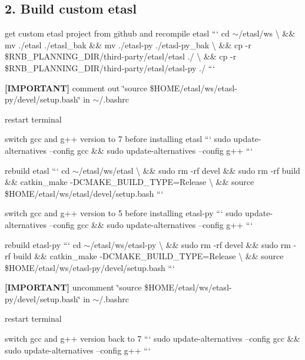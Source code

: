 \subsection*{2. Build custom etasl}


\begin{DoxyItemize}
\item get custom etasl project from github and recompile etasl ``` cd $\sim$/etasl/ws \textbackslash{} \&\& mv ./etasl ./etasl\+\_\+bak \&\& mv ./etasl-\/py ./etasl-\/py\+\_\+bak \textbackslash{} \&\& cp -\/r \$\+R\+N\+B\+\_\+\+P\+L\+A\+N\+N\+I\+N\+G\+\_\+\+D\+IR/third-\/party/etasl/etasl ./ \textbackslash{} \&\& cp -\/r \$\+R\+N\+B\+\_\+\+P\+L\+A\+N\+N\+I\+N\+G\+\_\+\+D\+IR/third-\/party/etasl/etasl-\/py ./ ```
\item {\bfseries \mbox{[}I\+M\+P\+O\+R\+T\+A\+NT\mbox{]}} comment out \char`\"{}source \$\+H\+O\+M\+E/etasl/ws/etasl-\/py/devel/setup.\+bash\char`\"{} in $\sim$/.bashrc
\item restart terminal
\item switch gcc and g++ version to 7 before installing etasl ``` sudo update-\/alternatives --config gcc \&\& sudo update-\/alternatives --config g++ ```
\item rebuild etasl ``` cd $\sim$/etasl/ws/etasl \textbackslash{} \&\& sudo rm -\/rf devel \&\& sudo rm -\/rf build \&\& catkin\+\_\+make -\/\+D\+C\+M\+A\+K\+E\+\_\+\+B\+U\+I\+L\+D\+\_\+\+T\+Y\+PE=Release \textbackslash{} \&\& source \$\+H\+O\+ME/etasl/ws/etasl/devel/setup.bash ```
\item switch gcc and g++ version to 5 before installing etasl-\/py ``` sudo update-\/alternatives --config gcc \&\& sudo update-\/alternatives --config g++ ```
\item rebuild etasl-\/py ``` cd $\sim$/etasl/ws/etasl-\/py \textbackslash{} \&\& sudo rm -\/rf devel \&\& sudo rm -\/rf build \&\& catkin\+\_\+make -\/\+D\+C\+M\+A\+K\+E\+\_\+\+B\+U\+I\+L\+D\+\_\+\+T\+Y\+PE=Release \textbackslash{} \&\& source \$\+H\+O\+ME/etasl/ws/etasl-\/py/devel/setup.bash ```
\item {\bfseries \mbox{[}I\+M\+P\+O\+R\+T\+A\+NT\mbox{]}} uncomment \char`\"{}source \$\+H\+O\+M\+E/etasl/ws/etasl-\/py/devel/setup.\+bash\char`\"{} in $\sim$/.bashrc
\item restart terminal
\item switch gcc and g++ version back to 7 ``` sudo update-\/alternatives --config gcc \&\& sudo update-\/alternatives --config g++ ```
\end{DoxyItemize}

